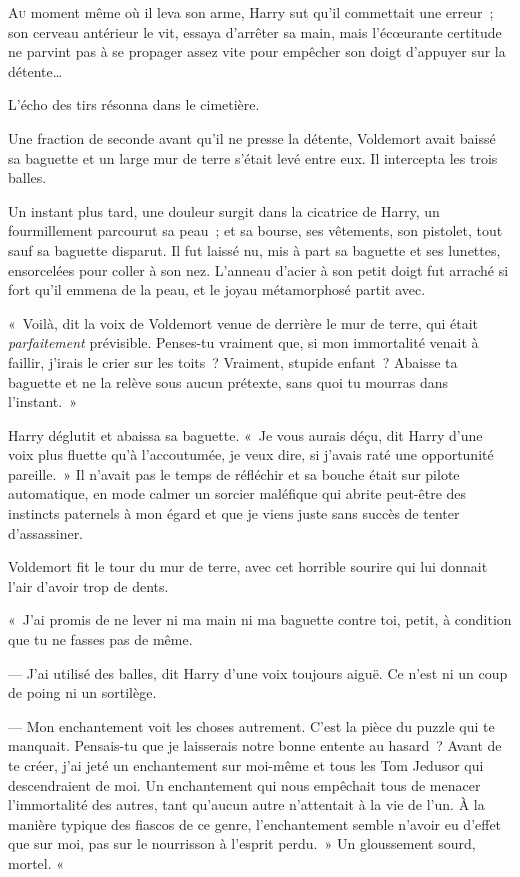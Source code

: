 
\lettrine{A}{u} moment même où il leva son arme, Harry sut qu'il commettait une erreur~; son cerveau antérieur le vit, essaya d'arrêter sa main, mais l'écœurante certitude ne parvint pas à se propager assez vite pour empêcher son doigt d'appuyer sur la détente…

L'écho des tirs résonna dans le cimetière.

Une fraction de seconde avant qu'il ne presse la détente, Voldemort avait baissé sa baguette et un large mur de terre s'était levé entre eux. Il intercepta les trois balles.

Un instant plus tard, une douleur surgit dans la cicatrice de Harry, un fourmillement parcourut sa peau~; et sa bourse, ses vêtements, son pistolet, tout sauf sa baguette disparut. Il fut laissé nu, mis à part sa baguette et ses lunettes, ensorcelées pour coller à son nez. L'anneau d'acier à son petit doigt fut arraché si fort qu'il emmena de la peau, et le joyau métamorphosé partit avec.

«~Voilà, dit la voix de Voldemort venue de derrière le mur de terre, qui était \emph{parfaitement} prévisible. Penses-tu vraiment que, si mon immortalité venait à faillir, j'irais le crier sur les toits~? Vraiment, stupide enfant~? Abaisse ta baguette et ne la relève sous aucun prétexte, sans quoi tu mourras dans l'instant.~»

Harry déglutit et abaissa sa baguette. «~Je vous aurais déçu, dit Harry d'une voix plus fluette qu'à l'accoutumée, je veux dire, si j'avais raté une opportunité pareille.~» Il n'avait pas le temps de réfléchir et sa bouche était sur pilote automatique, en mode calmer un sorcier maléfique qui abrite peut-être des instincts paternels à mon égard et que je viens juste sans succès de tenter d'assassiner.

Voldemort fit le tour du mur de terre, avec cet horrible sourire qui lui donnait l'air d'avoir trop de dents.

«~J'ai promis de ne lever ni ma main ni ma baguette contre toi, petit, à condition que tu ne fasses pas de même.

--- J'ai utilisé des balles, dit Harry d'une voix toujours aiguë. Ce n'est ni un coup de poing ni un sortilège.

--- Mon enchantement voit les choses autrement. C'est la pièce du puzzle qui te manquait. Pensais-tu que je laisserais notre bonne entente au hasard~? Avant de te créer, j'ai jeté un enchantement sur moi-même et tous les Tom Jedusor qui descendraient de moi. Un enchantement qui nous empêchait tous de menacer l'immortalité des autres, tant qu'aucun autre n'attentait à la vie de l'un. À la manière typique des fiascos de ce genre, l'enchantement semble n'avoir eu d'effet que sur moi, pas sur le nourrisson à l'esprit perdu.~» Un gloussement sourd, mortel. «~

